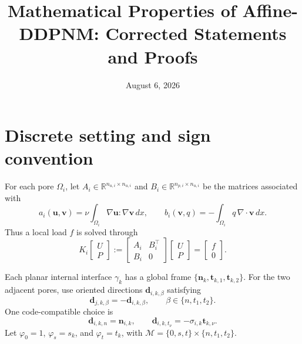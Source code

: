 \documentclass[11pt,a4paper]{article}
\newcommand{\R}{\mathbb{R}}
\newcommand{\normal}{\bm n}
\newcommand{\modeset}{\mathcal M}
\begin{document}
\title{\textbf{Mathematical Properties of Affine-DDPNM: Corrected Statements and Proofs}}
\author{}
\date{August 6, 2026}
\maketitle

\begin{center}
\end{center}

\section{Discrete setting and sign convention}

For each pore $\Omega_i$, let $A_i\in\R^{n_{u,i}\times n_{u,i}}$ and
$B_i\in\R^{n_{p,i}\times n_{u,i}}$ be the matrices associated with
\[
 a_i(\bm u,\bm v)=\nu\int_{\Omega_i}\nabla\bm u:\nabla\bm v\,dx,
 \qquad
 b_i(\bm v,q)=-\int_{\Omega_i}q\,\nabla\cdot\bm v\,dx.
\]
Thus a local load $f$ is solved through
\begin{equation}\label{eq:saddle}
 K_i\begin{bmatrix}U\\P\end{bmatrix}
 :=\begin{bmatrix}A_i&B_i^\top\\B_i&0\end{bmatrix}
 \begin{bmatrix}U\\P\end{bmatrix}
 =\begin{bmatrix}f\\0\end{bmatrix}.
\end{equation}

Each planar internal interface $\gamma_k$ has a global frame
$\{\normal_k,\bm t_{k,1},\bm t_{k,2}\}$.  For the two adjacent pores, use
oriented directions $\bm d_{i,k,\beta}$ satisfying
\begin{equation}\label{eq:opposite-d}
 \bm d_{j,k,\beta}=-\bm d_{i,k,\beta},
 \qquad \beta\in\{n,t_1,t_2\}.
\end{equation}
One code-compatible choice is
\[
 \bm d_{i,k,n}=\normal_{i,k},\qquad
 \bm d_{i,k,t_\nu}=-\sigma_{i,k}\bm t_{k,\nu}.
\]
Let $\varphi_0=1$, $\varphi_s=s_k$, and $\varphi_t=t_k$, with
$\modeset=\{0,s,t\}\times\{n,t_1,t_2\}$.
\end{document}
